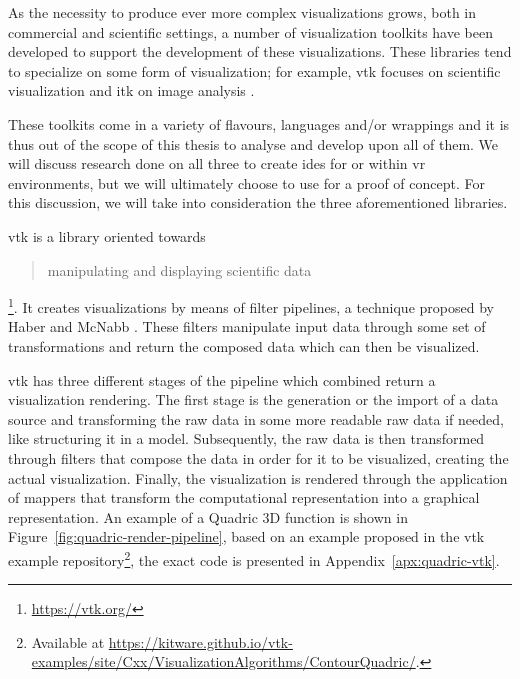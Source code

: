 As the necessity to produce ever more complex visualizations grows, both in commercial and scientific settings, a number of visualization toolkits have been developed to support the development of these visualizations. These libraries tend to specialize on some form of visualization; for example, \acrfull{vtk} focuses on scientific visualization \cite{kruis_creating_2017} and \acrfull{itk} on image analysis \cite{yoo_engineering_2002}.

These toolkits come in a variety of flavours, languages and/or wrappings and it is thus out of the scope of this thesis to analyse and develop upon all of them. We will discuss research done on all three to create \acrshort{ide}s for or within \acrshort{vr} environments, but we will ultimately choose to use for a proof of concept. For this discussion, we will take into consideration the three aforementioned libraries.

\acrfull{vtk} is a library oriented towards \blockquote{manipulating and displaying scientific data}\footnote{\url{https://vtk.org/}}. It creates visualizations by means of filter pipelines, a technique proposed by Haber and McNabb \cite{haber1990visualization}. These filters manipulate input data through some set of transformations and return the composed data which can then be visualized. 

\acrshort{vtk} has three different stages of the pipeline which combined return a visualization rendering. The first stage is the generation or the import of a data source and transforming the raw data in some more readable raw data if needed, like structuring it in a model. Subsequently, the raw data is then transformed through filters that compose the data in order for it to be visualized, creating the actual visualization. Finally, the visualization is rendered through the application of mappers that transform the computational representation into a graphical representation. An example of a Quadric 3D function is shown in Figure~\ref{fig:quadric-render-pipeline}, based on an example proposed in the \acrshort{vtk} example repository\footnote{Available at \url{https://kitware.github.io/vtk-examples/site/Cxx/VisualizationAlgorithms/ContourQuadric/}.}, the exact code is presented in Appendix~\ref{apx:quadric-vtk}.

